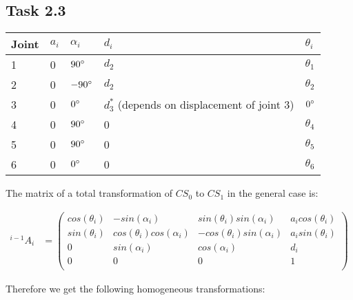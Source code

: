 \subsection*{Task 2.3}

\begin{center}
	\begin{tabular}{ | l | l | l | l | l |}
		\hline
		Joint & $a_{i}$ & $\alpha_{i}$ & $d_i$ & $\theta_i$ \\ \hline
		1 & 0 & $90\degree$ & $d_2$ & $\theta_1$\\ \hline
		2 & 0 & $-90\degree$ & $d_2$ & $\theta_2$\\ \hline
		3 & 0 & $0\degree$ & $d^*_3$ (depends on displacement of joint 3) & $0\degree$\\ \hline
		4 & 0 & $90\degree$ & 0 & $\theta_4$\\ \hline
		5 & 0 & $90\degree$ & 0 & $\theta_5$\\ \hline
		6 & 0 & $0\degree$ & 0 & $\theta_6$\\ \hline
	\end{tabular}
\end{center}

The matrix of a total transformation of $CS_0$ to $CS_1$ in the general case is:

\begin{align*}
^{i-1}A_i &= 
\begin{pmatrix}
cos(\theta_i) & -sin(\alpha_i) & sin(\theta_i)sin(\alpha_i) & a_icos(\theta_i) \\
sin(\theta_i) & cos(\theta_i)cos(\alpha_i) & -cos(\theta_i)sin(\alpha_i) & a_isin(\theta_i) \\
0 & sin(\alpha_i) & cos(\alpha_i) & d_i \\
0 & 0 & 0 & 1 \\
\end{pmatrix}
\end{align*}

Therefore we get the following homogeneous transformations: